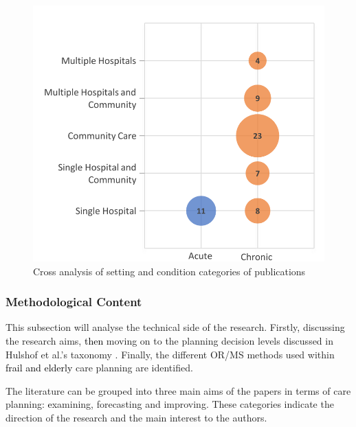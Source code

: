 \documentclass[../thesis.tex]{subfiles}
\begin{document}
\begin{figure}[H]
\centering
  \includegraphics[scale =0.6]{Chapter2/Figures/HospitalCondition1.pdf}
\caption{Cross analysis of setting and condition categories of publications}
\label{fig:HospCondition}  
\end{figure} 



\subsubsection{Methodological Content}
This subsection will analyse the technical side of the research. Firstly\textcolor{black}{,} discussing the research aims, \textcolor{black}{then} moving on to the planning decision levels discussed in Hulshof et al.'s taxonomy \cite{PHulshof}. Finally, the different OR/MS methods used within \textcolor{black}{frail and elderly} care planning are identified.

The literature can be grouped into three main aims of the papers in terms of care planning: \textcolor{black}{e}xamining, forecasting and improving. These categories indicate the direction of the research and the main interest to the authors. 
\end{document}
